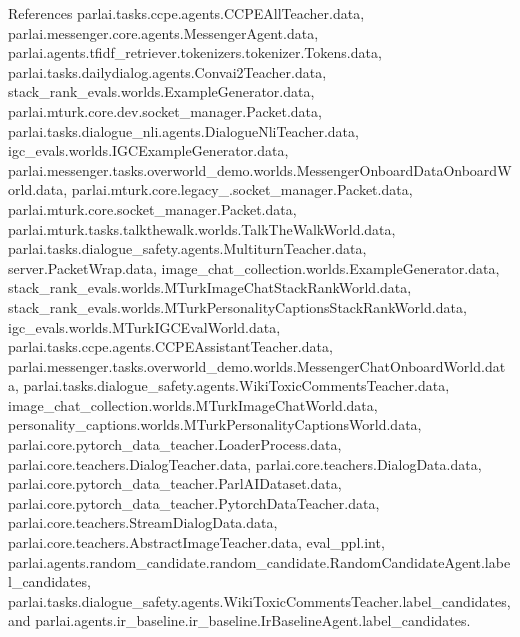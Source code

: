 References parlai.\+tasks.\+ccpe.\+agents.\+C\+C\+P\+E\+All\+Teacher.\+data, parlai.\+messenger.\+core.\+agents.\+Messenger\+Agent.\+data, parlai.\+agents.\+tfidf\+\_\+retriever.\+tokenizers.\+tokenizer.\+Tokens.\+data, parlai.\+tasks.\+dailydialog.\+agents.\+Convai2\+Teacher.\+data, stack\+\_\+rank\+\_\+evals.\+worlds.\+Example\+Generator.\+data, parlai.\+mturk.\+core.\+dev.\+socket\+\_\+manager.\+Packet.\+data, parlai.\+tasks.\+dialogue\+\_\+nli.\+agents.\+Dialogue\+Nli\+Teacher.\+data, igc\+\_\+evals.\+worlds.\+I\+G\+C\+Example\+Generator.\+data, parlai.\+messenger.\+tasks.\+overworld\+\_\+demo.\+worlds.\+Messenger\+Onboard\+Data\+Onboard\+World.\+data, parlai.\+mturk.\+core.\+legacy\+\_.\+socket\+\_\+manager.\+Packet.\+data, parlai.\+mturk.\+core.\+socket\+\_\+manager.\+Packet.\+data, parlai.\+mturk.\+tasks.\+talkthewalk.\+worlds.\+Talk\+The\+Walk\+World.\+data, parlai.\+tasks.\+dialogue\+\_\+safety.\+agents.\+Multiturn\+Teacher.\+data, server.\+Packet\+Wrap.\+data, image\+\_\+chat\+\_\+collection.\+worlds.\+Example\+Generator.\+data, stack\+\_\+rank\+\_\+evals.\+worlds.\+M\+Turk\+Image\+Chat\+Stack\+Rank\+World.\+data, stack\+\_\+rank\+\_\+evals.\+worlds.\+M\+Turk\+Personality\+Captions\+Stack\+Rank\+World.\+data, igc\+\_\+evals.\+worlds.\+M\+Turk\+I\+G\+C\+Eval\+World.\+data, parlai.\+tasks.\+ccpe.\+agents.\+C\+C\+P\+E\+Assistant\+Teacher.\+data, parlai.\+messenger.\+tasks.\+overworld\+\_\+demo.\+worlds.\+Messenger\+Chat\+Onboard\+World.\+data, parlai.\+tasks.\+dialogue\+\_\+safety.\+agents.\+Wiki\+Toxic\+Comments\+Teacher.\+data, image\+\_\+chat\+\_\+collection.\+worlds.\+M\+Turk\+Image\+Chat\+World.\+data, personality\+\_\+captions.\+worlds.\+M\+Turk\+Personality\+Captions\+World.\+data, parlai.\+core.\+pytorch\+\_\+data\+\_\+teacher.\+Loader\+Process.\+data, parlai.\+core.\+teachers.\+Dialog\+Teacher.\+data, parlai.\+core.\+teachers.\+Dialog\+Data.\+data, parlai.\+core.\+pytorch\+\_\+data\+\_\+teacher.\+Parl\+A\+I\+Dataset.\+data, parlai.\+core.\+pytorch\+\_\+data\+\_\+teacher.\+Pytorch\+Data\+Teacher.\+data, parlai.\+core.\+teachers.\+Stream\+Dialog\+Data.\+data, parlai.\+core.\+teachers.\+Abstract\+Image\+Teacher.\+data, eval\+\_\+ppl.\+int, parlai.\+agents.\+random\+\_\+candidate.\+random\+\_\+candidate.\+Random\+Candidate\+Agent.\+label\+\_\+candidates, parlai.\+tasks.\+dialogue\+\_\+safety.\+agents.\+Wiki\+Toxic\+Comments\+Teacher.\+label\+\_\+candidates, and parlai.\+agents.\+ir\+\_\+baseline.\+ir\+\_\+baseline.\+Ir\+Baseline\+Agent.\+label\+\_\+candidates.



